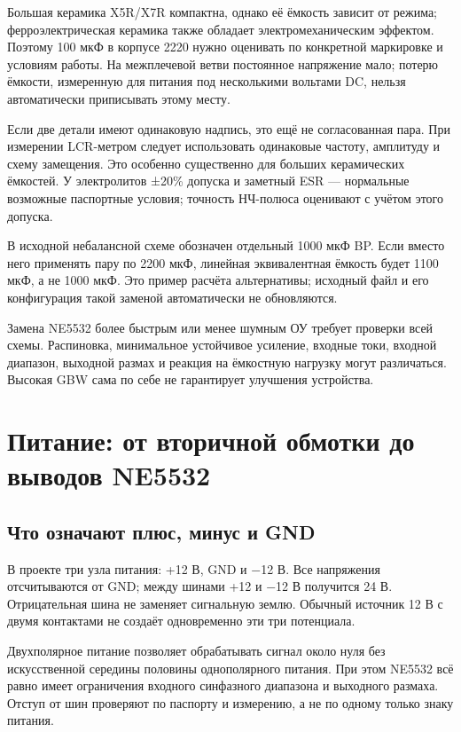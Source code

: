 \documentclass[a4paper,11pt]{article}
\begin{document}
Большая керамика X5R/X7R компактна, однако её ёмкость зависит от режима;
ферроэлектрическая керамика также обладает электромеханическим эффектом\cite{murata}.
Поэтому 100 мкФ в корпусе 2220 нужно оценивать по конкретной маркировке
и условиям работы. На межплечевой ветви постоянное напряжение мало;
потерю ёмкости, измеренную для питания под несколькими вольтами DC,
нельзя автоматически приписывать этому месту.

Если две детали имеют одинаковую надпись, это ещё не согласованная пара.
При измерении LCR-метром следует использовать одинаковые частоту, амплитуду
и схему замещения. Это особенно существенно для больших керамических ёмкостей.
У электролитов ±20\% допуска и заметный ESR — нормальные возможные паспортные
условия; точность НЧ-полюса оценивают с учётом этого допуска.

В исходной небалансной схеме обозначен отдельный 1000 мкФ BP. Если вместо него
применять пару по 2200 мкФ, линейная эквивалентная ёмкость будет 1100 мкФ,
а не 1000 мкФ. Это пример расчёта альтернативы; исходный файл и его конфигурация
такой заменой автоматически не обновляются.

Замена NE5532 более быстрым или менее шумным ОУ требует проверки всей схемы.
Распиновка, минимальное устойчивое усиление, входные токи, входной диапазон,
выходной размах и реакция на ёмкостную нагрузку могут различаться.
Высокая GBW сама по себе не гарантирует улучшения устройства.

\section{Питание: от вторичной обмотки до выводов NE5532}

\subsection{Что означают плюс, минус и GND}

В проекте три узла питания: +12 В, GND и −12 В. Все напряжения отсчитываются
от GND; между шинами +12 и −12 В получится 24 В.
Отрицательная шина не заменяет сигнальную землю. Обычный источник 12 В с двумя
контактами не создаёт одновременно эти три потенциала.

Двухполярное питание позволяет обрабатывать сигнал около нуля без искусственной
середины половины однополярного питания. При этом NE5532 всё равно имеет ограничения
входного синфазного диапазона и выходного размаха. Отступ от шин проверяют по
паспорту и измерению, а не по одному только знаку питания.
\end{document}
